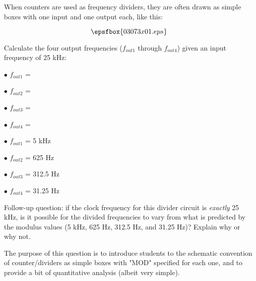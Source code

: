 

When counters are used as frequency dividers, they are often drawn as simple boxes with one input and one output each, like this:

$$\epsfbox{03073x01.eps}$$

Calculate the four output frequencies ($f_{out1}$ through $f_{out4}$) given an input frequency of 25 kHz:

\medskip
\goodbreak
\item{$\bullet$} $f_{out1}$ = 
\item{$\bullet$} $f_{out2}$ = 
\item{$\bullet$} $f_{out3}$ = 
\item{$\bullet$} $f_{out4}$ = 
\medskip







\medskip
\goodbreak
\item{$\bullet$} $f_{out1}$ = 5 kHz
\item{$\bullet$} $f_{out2}$ = 625 Hz
\item{$\bullet$} $f_{out3}$ = 312.5 Hz
\item{$\bullet$} $f_{out4}$ = 31.25 Hz
\medskip

\vskip 10pt

Follow-up question: if the clock frequency for this divider circuit is {\it exactly} 25 kHz, is it possible for the divided frequencies to vary from what is predicted by the modulus values (5 kHz, 625 Hz, 312.5 Hz, and 31.25 Hz)?  Explain why or why not.







The purpose of this question is to introduce students to the schematic convention of counter/dividers as simple boxes with "MOD" specified for each one, and to provide a bit of quantitative analysis (albeit very simple).




